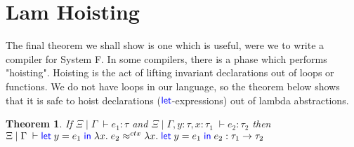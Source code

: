 \documentclass[a4paper, 11pt]{report}
\newtheorem{theorem}{Theorem}
\theoremstyle{definition}
\newcommand{\Keyword}[1]{{\color{blue} \mathsf{#1}}}
\newcommand{\var}{x}
\newcommand{\varB}{y}
\newcommand{\expr}{e}
\newcommand{\LetCmd}{\Keyword{let}}
\newcommand{\Tfunc}[2]{#1 \rightarrow #2}
\newcommand{\typ}{\tau}
\newcommand{\venv}{\Gamma}
\newcommand{\tenv}{\Xi}
\newcommand{\jdg}[4]{#1 \; | \; #2 \; \vdash #3 : #4}
\newcommand{\jdgRel}[6]{#1 \; | \; #2 \; \vdash #3 \approx^{#4} #5 : #6}
\newcommand{\ctxRel}[5]{\jdgRel{#1}{#2}{#3}{ctx}{#4}{#5}}
\begin{document}
\section{Lam Hoisting}
The final theorem we shall show is one which is useful, were we to write a compiler for System F. In some compilers, there is a phase which performs "hoisting". Hoisting is the act of lifting invariant declarations out of loops or functions. We do not have loops in our language, so the theorem below shows that it is safe to hoist declarations ($\LetCmd$-expressions) out of lambda abstractions.
\begin{theorem}
  If $\jdg{\tenv}{\venv}{\expr_1}{\typ}$ and $\jdg{\tenv}{\venv, \varB : \typ, \var : \typ_1}{\expr_2}{\typ_2}$ then\\
  $\ctxRel{\tenv}{\venv}{\Let \varB = \expr_1 in \fun \var . \expr_2}{\fun \var . \Let \varB = \expr_1 in \expr_2}{\Tfunc{\typ_1}{\typ_2}}$
\end{theorem}
\end{document}
